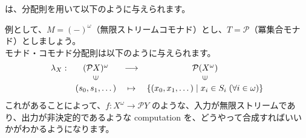 \documentclass[
		head_space=20mm,
		foot_space=20mm,
		gutter=10mm,
		line_length=190mm
]{jlreq}
\begin{document}
\begin{prooftree}
	 
\end{prooftree}
は、分配則を用いて以下のように与えられます。
\begin{center}
\end{center}


\begin{example}
例として、$M=(-)^\omega$（無限ストリームコモナド）とし、$T=\mathcal P$（冪集合モナド）としましょう。\\ モナド・コモナド分配則は以下のように与えられます。
\[\begin{array}{cccc}\lambda_X:&(\mathcal PX)^\omega&\longrightarrow&\mathcal P(X^\omega)\\ & \rotatebox{90}{$\in$} && \rotatebox{90}{$\in$} \\ & (s_0,s_1,\dots) & \mapsto & \left\{(x_0,x_1,\dots) \mid x_i\in S_i\; (\forall i\in\omega) \right\} \end{array}\]
これがあることによって、$f:X^\omega\to\mathcal PY$ のような、入力が無限ストリームであり、出力が非決定的であるような computation を、どうやって合成すればいいかがわかるようになります。
\end{example}
\end{document}
